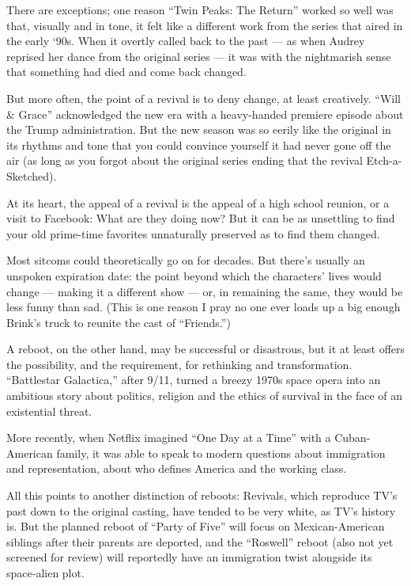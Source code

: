 There are exceptions; one reason ``Twin Peaks: The Return'' worked so
well was that, visually and in tone, it felt like a different work from
the series that aired in the early `90s. When it overtly called back to
the past --- as when Audrey reprised her dance from the original series
--- it was with the nightmarish sense that something had died and come
back changed.

But more often, the point of a revival is to deny change, at least
creatively. ``Will \& Grace'' acknowledged the new era with a
heavy-handed premiere episode about the Trump administration. But the
new season was so eerily like the original in its rhythms and tone that
you could convince yourself it had never gone off the air (as long as
you forgot about the original series ending that the revival
Etch-a-Sketched).

At its heart, the appeal of a revival is the appeal of a high school
reunion, or a visit to Facebook: What are they doing now? But it can be
as unsettling to find your old prime-time favorites unnaturally
preserved as to find them changed.

Most sitcoms could theoretically go on for decades. But there's usually
an unspoken expiration date: the point beyond which the characters'
lives would change --- making it a different show --- or, in remaining
the same, they would be less funny than sad. (This is one reason I pray
no one ever loads up a big enough Brink's truck to reunite the cast of
``Friends.'')

A reboot, on the other hand, may be successful or disastrous, but it at
least offers the possibility, and the requirement, for rethinking and
transformation. ``Battlestar Galactica,'' after 9/11, turned a breezy
1970s space opera into an ambitious story about politics, religion and
the ethics of survival in the face of an existential threat.

More recently, when Netflix imagined ``One Day at a Time'' with a
Cuban-American family, it was able to speak to modern questions about
immigration and representation, about who defines America and the
working class.

All this points to another distinction of reboots: Revivals, which
reproduce TV's past down to the original casting, have tended to be very
white, as TV's history is. But the planned reboot of ``Party of Five''
will focus on Mexican-American siblings after their parents are
deported, and the ``Roswell'' reboot (also not yet screened for review)
will reportedly have an immigration twist alongside its space-alien
plot.

